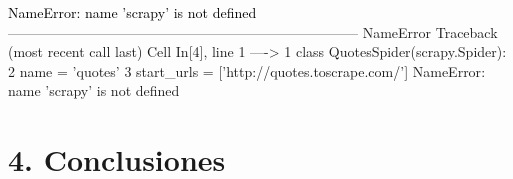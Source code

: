 \documentclass[
  letterpaper,
  DIV=11,
  numbers=noendperiod]{scrartcl}
\makeatletter
\newcommand*\pandocbounded[1]{%
  \sbox\pandoc@box{#1}%
  \Gscale@div\@tempa{\textheight}{\dimexpr\ht\pandoc@box+\dp\pandoc@box\relax}%
  \Gscale@div\@tempb{\linewidth}{\wd\pandoc@box}%
  \ifdim\@tempb\p@<\@tempa\p@\let\@tempa\@tempb\fi%
  \ifdim\@tempa\p@<\p@\scalebox{\@tempa}{\usebox\pandoc@box}%
  \else\usebox{\pandoc@box}%
  \fi%
}
\makeatother
\begin{document}
\begin{Highlighting}
\textcolor{black}{NameError: name 'scrapy' is not defined}
\textcolor{black}{}\textcolor{QuartoInternalColor1}{---------------------------------------------------------------------------}\textcolor{QuartoInternalColor2}{}
\textcolor{QuartoInternalColor2}{}\textcolor{QuartoInternalColor1}{NameError}\textcolor{QuartoInternalColor2}{                                 Traceback (most recent call last)}
\textcolor{QuartoInternalColor2}{Cell }\textcolor{QuartoInternalColor3}{In[4], line 1}\textcolor{QuartoInternalColor2}{}
\textcolor{QuartoInternalColor2}{}\textcolor{QuartoInternalColor3}{----> 1}\textcolor{QuartoInternalColor2}{ }\textcolor{QuartoInternalColor4}{class}\textcolor{QuartoInternalColor2}{ }\textcolor{QuartoInternalColor5}{QuotesSpider}\textcolor{QuartoInternalColor2}{(scrapy}\textcolor{QuartoInternalColor6}{.}\textcolor{QuartoInternalColor2}{Spider):}
\textcolor{QuartoInternalColor2}{}\textcolor{QuartoInternalColor7}{      2}\textcolor{QuartoInternalColor2}{     name }\textcolor{QuartoInternalColor6}{=}\textcolor{QuartoInternalColor2}{ }\textcolor{QuartoInternalColor8}{'}\textcolor{QuartoInternalColor2}{}\textcolor{QuartoInternalColor8}{quotes}\textcolor{QuartoInternalColor2}{}\textcolor{QuartoInternalColor8}{'}\textcolor{QuartoInternalColor2}{}
\textcolor{QuartoInternalColor2}{}\textcolor{QuartoInternalColor7}{      3}\textcolor{QuartoInternalColor2}{     start_urls }\textcolor{QuartoInternalColor6}{=}\textcolor{QuartoInternalColor2}{ [}\textcolor{QuartoInternalColor8}{'}\textcolor{QuartoInternalColor2}{}\textcolor{QuartoInternalColor8}{http://quotes.toscrape.com/}\textcolor{QuartoInternalColor2}{}\textcolor{QuartoInternalColor8}{'}\textcolor{QuartoInternalColor2}{]}
\textcolor{QuartoInternalColor2}{}\textcolor{QuartoInternalColor1}{NameError}\textcolor{QuartoInternalColor2}{: name 'scrapy' is not defined}
\end{Highlighting}

\pandocbounded{\texttt{[image: Imagen2.png]}}

\section{4. Conclusiones}\label{conclusiones}
\end{document}
